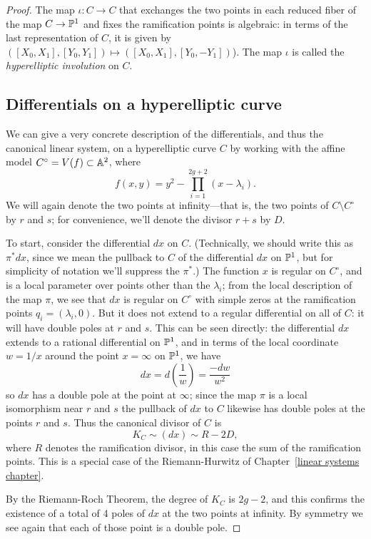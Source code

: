 \begin{proof}
 The map $\iota : C \to C$ that exchanges the two points in each reduced fiber of the map $C \to \PP^1$ and fixes the ramification points is algebraic: in terms of the last representation of $C$, it is given by $([X_0,X_1], [Y_0,Y_1]) \mapsto  ([X_0,X_1], [Y_0,-Y_1]) $). The map $\iota$ is called the \emph{hyperelliptic involution} on $C$.

  
  \subsection{Differentials on a hyperelliptic curve}

We can give a very concrete description of the differentials, and thus the canonical linear system, on a hyperelliptic curve $C$ by working with the affine model $C^\circ = V(f) \subset \AA^2$, where
$$
f(x,y) = y^2 - \prod_{i=1}^{2g+2} (x - \lambda_i).
$$
We will again denote the two points at infinity---that is, the two points of $C \setminus C^\circ$ by $r$ and $s$; for convenience, we'll denote the divisor $r+s$ by $D$.

To start, consider the differential $dx$ on $C$. (Technically, we should write this as $\pi^*dx$, since we mean the pullback to $C$ of the differential $dx$ on $\PP^1$, but for simplicity of notation we'll suppress the $\pi^*$.)  The function $x$ is regular on $C^\circ$, and is a local parameter over points other than the $\lambda_i$; from the local description of the map $\pi$, we see that $dx$ is regular on $C^\circ$  with simple zeros at the ramification points $q_i = (\lambda_i, 0)$. But it does not extend to a regular differential on all of $C$: it will have double poles at $r$ and $s$.  This can be seen directly: the differential $dx$ extends to a rational differential on $\PP^1$, and in terms of the local coordinate $w = 1/x$ around the point $x = \infty$ on $\PP^1$, we have
$$
dx = d\left(\frac{1}{w}\right) = \frac{-dw}{w^2}
$$
so $dx$ has a double pole at the point at $\infty$; since the map $\pi$ is a local isomorphism near $r$ and $s$ the pullback of $dx$ to $C$ likewise has double poles at the points $r$ and $s$. Thus the canonical
divisor of $C$ is 
$$
K_C \sim (dx) \sim R - 2D,
$$
where $R$ denotes the ramification divisor, in this case the sum of the ramification points. 
This is a special case of the Riemann-Hurwitz of Chapter~\ref{linear systems chapter}.

By the Riemann-Roch Theorem, the degree of $K_C$ is $2g-2$, and this confirms the existence of
a total of 4 poles of $dx$ at the two points at infinity. By symmetry we see again that each of those point is a double pole.


\end{proof}
